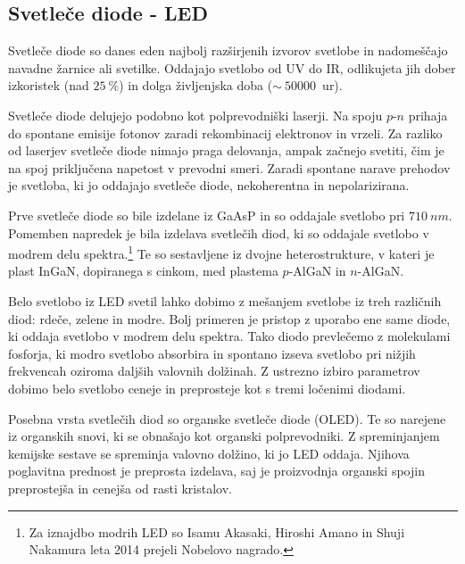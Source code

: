 \subsection{Svetleče diode - LED}
Svetleče diode so danes eden najbolj razširjenih izvorov svetlobe in nadomeščajo
navadne žarnice ali svetilke. Oddajajo svetlobo od UV do IR, odlikujeta jih 
dober izkoristek (nad $25~\%$) in dolga življenjska doba ($\sim~50 000$~ur).

Svetleče diode delujejo podobno kot polprevodniški laserji. Na spoju $p$-$n$ prihaja do 
spontane emisije fotonov zaradi rekombinacij elektronov in vrzeli. Za razliko od laserjev 
svetleče diode nimajo praga delovanja, ampak začnejo svetiti, čim je na spoj priključena 
napetost v prevodni smeri. Zaradi spontane narave prehodov je svetloba, ki jo oddajajo
svetleče diode, nekoherentna in nepolarizirana. 

Prve svetleče diode so bile izdelane iz GaAsP in so oddajale 
svetlobo pri $710~\si{nm}$. Pomemben
napredek je bila izdelava svetlečih diod, ki so oddajale svetlobo v modrem delu 
spektra.\footnote{Za iznajdbo modrih LED so Isamu Akasaki, Hiroshi Amano in 
Shuji Nakamura leta 2014 prejeli Nobelovo nagrado.} Te so sestavljene iz dvojne
heterostrukture, v kateri je plast InGaN, dopiranega s cinkom, 
med plastema $p$-AlGaN in $n$-AlGaN.

Belo svetlobo iz LED svetil lahko dobimo z mešanjem svetlobe iz treh različnih 
diod: rdeče, zelene in modre. Bolj primeren je pristop z uporabo ene same diode, 
ki oddaja svetlobo v modrem delu spektra. Tako diodo prevlečemo z molekulami fosforja, ki
modro svetlobo absorbira in spontano izseva svetlobo pri nižjih frekvencah 
oziroma daljših valovnih dolžinah. Z ustrezno izbiro parametrov dobimo belo svetlobo
ceneje in preprosteje kot s tremi ločenimi diodami. 

\begin{remark}
Posebna vrsta svetlečih diod so organske svetleče diode (OLED). Te so narejene iz
organskih snovi, ki se obnašajo kot organski polprevodniki. Z spreminjanjem kemijske
sestave se spreminja valovno dolžino, ki jo LED oddaja. Njihova poglavitna prednost
je preprosta izdelava, saj je proizvodnja organski spojin preprostejša in cenejša
od rasti kristalov. 
\end{remark}
